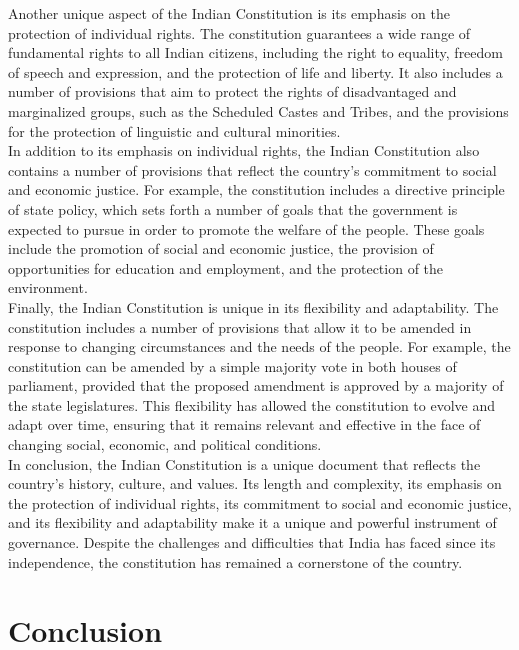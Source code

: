 \documentclass[11pt]{article}
\begin{document}
Another unique aspect of the Indian Constitution is its emphasis on the protection of individual rights. The constitution guarantees a wide range of fundamental rights to all Indian citizens, including the right to equality, freedom of speech and expression, and the protection of life and liberty. It also includes a number of provisions that aim to protect the rights of disadvantaged and marginalized groups, such as the Scheduled Castes and Tribes, and the provisions for the protection of linguistic and cultural minorities.\\

In addition to its emphasis on individual rights, the Indian Constitution also contains a number of provisions that reflect the country's commitment to social and economic justice. For example, the constitution includes a directive principle of state policy, which sets forth a number of goals that the government is expected to pursue in order to promote the welfare of the people. These goals include the promotion of social and economic justice, the provision of opportunities for education and employment, and the protection of the environment.\\

Finally, the Indian Constitution is unique in its flexibility and adaptability. The constitution includes a number of provisions that allow it to be amended in response to changing circumstances and the needs of the people. For example, the constitution can be amended by a simple majority vote in both houses of parliament, provided that the proposed amendment is approved by a majority of the state legislatures. This flexibility has allowed the constitution to evolve and adapt over time, ensuring that it remains relevant and effective in the face of changing social, economic, and political conditions.\\

In conclusion, the Indian Constitution is a unique document that reflects the country's history, culture, and values. Its length and complexity, its emphasis on the protection of individual rights, its commitment to social and economic justice, and its flexibility and adaptability make it a unique and powerful instrument of governance. Despite the challenges and difficulties that India has faced since its independence, the constitution has remained a cornerstone of the country.\\

\section{Conclusion}
\end{document}
